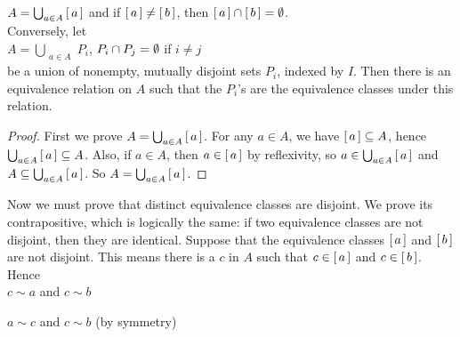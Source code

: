 \documentclass{article}
\begin{document}
   
   \hspace{10mm}
   $A = \bigcup_{\substack{ a \in A}}
   \left[ \, a \,\right] $ 
   and if 
   $\left[ \, a \,\right]  \neq \left[ \, b \,\right] $, 
   then 
   $\left[ \, a \,\right]  \cap \left[ \, b \,\right]  = \emptyset$. \\
   
   Conversely, let \\
   
  
   \hspace{10mm} $A = \bigcup_{
   \substack{ a \in A}
   } 
   P_{i}$,
   $P_{i} \cap P_{j} = \emptyset$ 
   if
   $i\neq j$ \\
   
   be a union of nonempty, mutually disjoint sets $P_{i}$, indexed by $I$. Then there is an equivalence relation on $A$ such that the
   $P_{i}$'s are the equivalence classes under this relation.
   
   \begin{proof}
   
    First we prove 
    $A = \bigcup_{
    \substack{ a \in A}
    } \left[ \, a \,\right] $. 
    For any 
    $a \in A$,
    we have 
    $\left[ \, a \,\right]  \subseteq A$,
    hence 
    $\bigcup_{
    \substack{ a \in A}
    } 
    \left[ \, a \,\right]  \subseteq A$. 
    Also, if 
    $a \in A$, 
    then
    $a \in \left[ \, a \,\right] $ by reflexivity, so 
    $a \in \bigcup_{
    \substack{ a \in A}
    } 
    \left[ \, a \,\right]  $ 
    and
    $A \subseteq \bigcup_{
    \substack{ a \in A}
    } 
    \left[ \, a \,\right] $. 
    So
    $A = \bigcup_{
    \substack{ a \in A}
    } 
    \left[ \, a \,\right] $.
   
   \end{proof}
   
   Now we must prove that distinct equivalence classes are disjoint. We prove its contrapositive, which is logically the same: if two equivalence classes are not disjoint, then they are identical. Suppose that the equivalence classes $\left[ \, a \,\right] $ and $\left[ \, b \,\right] $ are not disjoint. This means there is a $c$ in $A$ such that $c \in \left[ \, a \,\right] $ and $c \in \left[ \, b \,\right] $. Hence\\
   
   \hspace{10mm}
   $c\sim a$ and $c\sim b $ 
   
   \hspace{10mm} 
   $a\sim c$ and $c\sim b$  \hspace{11mm}(by symmetry)
   
\end{document}
